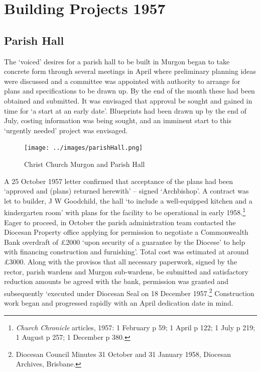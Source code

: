 \section{Building Projects 1957}



\subsection{Parish Hall}



The `voiced' desires for a parish hall to be built in Murgon began to take concrete form through several meetings in April where preliminary planning ideas were discussed and a committee was appointed with authority to arrange for plans and specifications to be drawn up. By the end of the month these had been obtained and submitted. It was envisaged that approval be sought and gained in time for `a start at an early date'. Blueprints had been drawn up by the end of July, costing information was being sought, and an imminent start to this `urgently needed' project was envisaged.









\begin{figure}[!htb]
\begin{center}
\texttt{[image: ../images/parishHall.png]}
\caption{Christ Church Murgon and Parish Hall}
\end{center}
\end{figure}




A 25 October 1957 letter confirmed that acceptance of the plans had been `approved and (plans) returned herewith' -- signed `Archbishop'. A contract was let to builder, J W Goodchild, the hall `to include a well-equipped kitchen and a kindergarten room' with plans for the facility to be operational in early 1958.\footnote{\emph{Church Chronicle} articles, 1957: 1 February p 59; 1 April p 122; 1 July p 219; 1 August p 257; 1 December p 380.} Eager to proceed, in October the parish administration team contacted the Diocesan Property office applying for permission to negotiate a Commonwealth Bank overdraft of \pounds2000 `upon security of a guarantee by the Diocese' to help with financing construction and furnishing'. Total cost was estimated at around \pounds3000. Along with the provisos that all necessary paperwork, signed by the rector, parish wardens and Murgon sub-wardens, be submitted and satisfactory reduction amounts be agreed with the bank, permission was granted and subsequently `executed under Diocesan Seal on 18 December 1957.\footnote{Diocesan Council Minutes 31 October and 31 January 1958, Diocesan Archives, Brisbane.} Construction work began and progressed rapidly with an April dedication date in mind.


